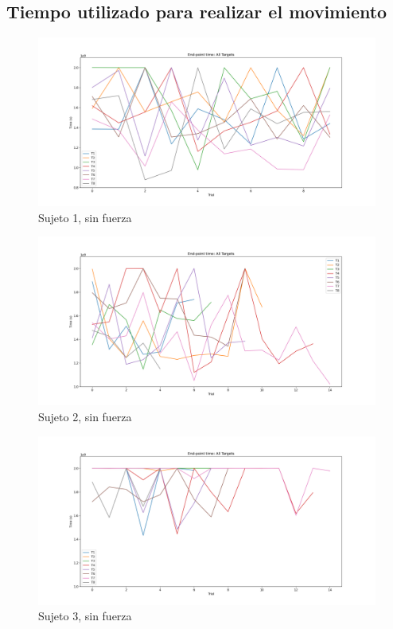 \documentclass[a4paper,11pt, oneside]{book}
\begin{document}
\subsection{Tiempo utilizado para realizar el movimiento}
\label{anexo:2}

\begin{figure}[H]
	\includegraphics[width=\linewidth]{sujeto1/no_force/evolution_time}
	\caption{Sujeto 1, sin fuerza}
	\label{1-1-3}
\end{figure}
\begin{figure}[H]
	\includegraphics[width=\linewidth]{sujeto2/no_force/evolution_time}
	\caption{Sujeto 2, sin fuerza}
	\label{2-1-3}
\end{figure}
\begin{figure}[H]
	\includegraphics[width=\linewidth]{sujeto3/no_force/evolution_time}
	\caption{Sujeto 3, sin fuerza}
	\label{3-1-3}
\end{figure}
\end{document}
